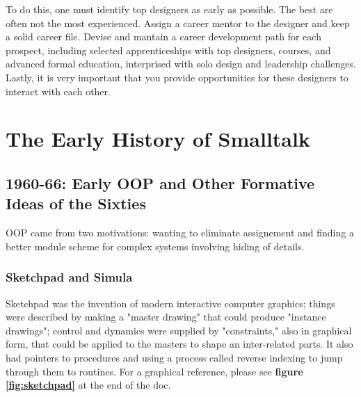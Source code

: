 \documentclass[letterpaper,12pt,parskip=full]{article}
\begin{document}
\begin{itemize}
    To do this, one must identify top designers as early as possible. The best are often not the most experienced. Assign a career mentor to the designer and keep a solid career file. Devise and mantain a career development path for each prospect, including selected apprenticeships with top designers, courses, and advanced formal education, interprised with solo design and leadership challenges. Lastly, it is very important that you provide opportunities for these designers to interact with each other.
\end{itemize}

\newpage

\section{The Early History of Smalltalk}

\subsection{1960-66: Early OOP and Other Formative Ideas of the Sixties}

OOP came from two motivations: wanting to eliminate assignement and finding a better module scheme for complex systems involving hiding of details.

\subsubsection{Sketchpad and Simula}

Sketchpad was the invention of modern interactive computer graphics; things were described by making a "master drawing" that could produce "instance drawings"; control and dynamics were supplied by "constraints," also in graphical form, that could be applied to the masters to shape an inter-related parts. It also had pointers to procedures and using a process called reverse indexing to jump through them to routines. For a graphical reference, please see \textbf{figure \ref{fig:sketchpad}} at the end of the doc.
\end{document}
